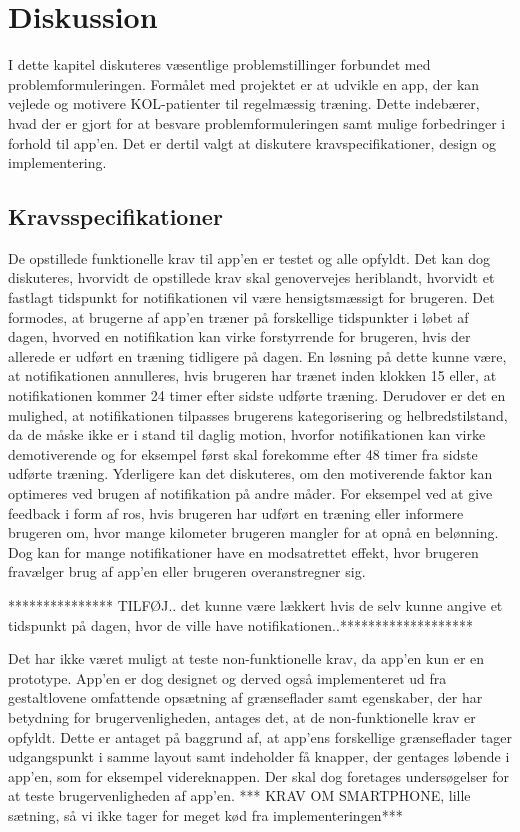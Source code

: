 \section{Diskussion}
I dette kapitel diskuteres væsentlige problemstillinger forbundet med problemformuleringen. Formålet med projektet er at udvikle en app, der kan vejlede og motivere KOL-patienter til regelmæssig træning. Dette indebærer, hvad der er gjort for at besvare problemformuleringen samt mulige forbedringer i forhold til app'en. Det er dertil valgt at diskutere kravspecifikationer, design og implementering.

\subsection{Kravsspecifikationer}
De opstillede funktionelle krav til app’en er testet og alle opfyldt. Det kan dog diskuteres, hvorvidt de opstillede krav skal genovervejes heriblandt, hvorvidt et fastlagt tidspunkt for notifikationen vil være hensigtsmæssigt for brugeren. Det formodes, at brugerne af app’en træner på forskellige tidspunkter i løbet af dagen, hvorved en notifikation kan virke forstyrrende for brugeren, hvis der allerede er udført en træning tidligere på dagen. En løsning på dette kunne være, at notifikationen annulleres, hvis brugeren har trænet inden klokken 15 eller, at notifikationen kommer 24 timer efter sidste udførte træning. Derudover er det en mulighed, at notifikationen tilpasses brugerens kategorisering og helbredstilstand, da de måske ikke er i stand til daglig motion, hvorfor notifikationen kan virke demotiverende og for eksempel først skal forekomme efter 48 timer fra sidste udførte træning. Yderligere kan det diskuteres, om den motiverende faktor kan optimeres ved brugen af notifikation på andre måder. For eksempel ved at give feedback i form af ros, hvis brugeren har udført en træning eller informere brugeren om, hvor mange kilometer brugeren mangler for at opnå en belønning. Dog kan for mange notifikationer have en modsatrettet effekt, hvor brugeren fravælger brug af app’en eller brugeren overanstregner sig. 

*************** TILFØJ.. det kunne være lækkert hvis de selv kunne angive et tidspunkt på dagen, hvor de ville have notifikationen..*******************

Det har ikke været muligt at teste non-funktionelle krav, da app’en kun er en prototype. App’en er dog designet og derved også implementeret ud fra gestaltlovene omfattende opsætning af grænseflader samt egenskaber, der har betydning for brugervenligheden, antages det, at de non-funktionelle krav er opfyldt. Dette er antaget på baggrund af, at app'ens forskellige grænseflader tager udgangspunkt i samme layout samt indeholder få knapper, der gentages løbende i app’en, som for eksempel videreknappen. Der skal dog foretages undersøgelser for at teste brugervenligheden af app'en.
 *** KRAV OM SMARTPHONE, lille sætning, så vi ikke tager for meget kød fra implementeringen***

